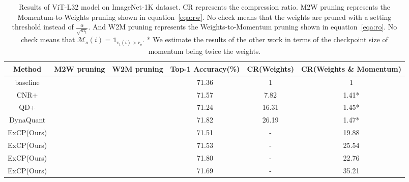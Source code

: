 \documentclass{article}
\theoremstyle{plain}
\theoremstyle{definition}
\theoremstyle{remark}
\begin{document}
\begin{CJK}{UTF8}{gbsn}
\begin{table}[t]
	\vspace{-10pt}
	\caption{Results of ViT-L32 model on ImageNet-1K dataset. CR represents the compression ratio. M2W pruning represents the Momentum-to-Weights pruning shown in equation~\ref{eqa:rw}. No check means that the weights are pruned with a setting threshold instead of $\frac{\alpha}{\sqrt{m_t}}$. And W2M pruning represents the Weights-to-Momentum pruning shown in equation~\ref{eqa:ro}. No check means that $\mathcal{M}_o(i) = \mathds{1}_{v_{t}(i) > r_o}$. * We estimate the results of the other work in terms of the checkpoint size of momentum being twice the weights.}
	\centering
	\begin{tabular}{@{}c|cc|ccc@{}}
		\toprule
		Method     & M2W pruning & W2M pruning & Top-1 Accuracy(\%) & CR(Weights)   & CR(Weights \& Momentum)  \\ \midrule
		baseline   &             &             & 71.36        & 1     & 1     \\
		CNR+       &             &             & 71.57        & 7.82  & 1.41*  \\
		QD+        &             &             & 71.24        & 16.31 & 1.45*  \\
		DynaQuant  &             &             & 71.82        & 26.19 & 1.47*  \\ \midrule
		ExCP(Ours) &             &             &      71.51        &  -     &  19.88     \\
		ExCP(Ours) &  \checkmark           &             &      71.53        &    -   &  25.54     \\
		ExCP(Ours) &             &  \checkmark          &       71.80       &  -     &    22.76   \\
		ExCP(Ours) &  \checkmark           &  \checkmark           & 71.69        & -     & 35.21 \\ \bottomrule
	\end{tabular}
	\label{table:vit}
\end{table}


\end{CJK}
\end{document}
